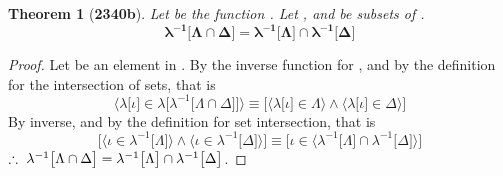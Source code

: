 \documentclass[preview]{standalone}
\newtheorem*{theorem*}{Theorem}
\begin{document}
\begin{theorem*}[\textbf{2340b}]
    Let \bm{$\lambda$} be the function 
    . 
    Let \bm{$\Lambda$}, and \bm{$\Delta$} 
    be subsets of . 
    \begin{equation*}
        \bm{
        \lambda ^{-1} \big[ \Lambda \cap \Delta \big] 
            = 
        \lambda ^{-1} 
            \big[ \Lambda \big] 
                \cap 
            \lambda^{-1} \big[ \Delta \big]
        }
    \end{equation*}
\end{theorem*}

\begin{proof}
    Let \bm{$\iota$} be an element in .
    By the inverse function for
    , 
    and by the definition for the intersection of sets, that is 
    \begin{equation*}
        \bigg \langle \lambda 
            \big[ \iota \big] 
                \in 
            \lambda \Big[ 
                \lambda ^{-1} \big[ \Lambda \cap \Delta \big]
            \Big]
        \bigg \rangle
            \equiv
        \bigg[
            \Big \langle \lambda \big[ \iota \big] \in \Lambda \Big \rangle
                \land 
            \Big \langle \lambda \big[ \iota \big] \in \Delta \Big \rangle
        \bigg]
    \end{equation*}
    By \bm{$\lambda$} inverse, and by the definition for set intersection, that is
    \begin{equation*}
        \bigg[
            \Big \langle
                \iota \in \lambda^{-1} \big[ \Lambda \big] 
            \Big \rangle
                \land 
            \Big \langle
                \iota \in \lambda^{-1} \big[ \Delta \big]
            \Big \rangle
        \bigg]
            \equiv
        \bigg[ 
            \iota \in \Big \langle
                \lambda ^{-1} \big[ \Lambda \big] 
                    \cap 
                \lambda ^{-1} \big[ \Delta \big]
            \Big \rangle
        \bigg]
    \end{equation*}
    $\therefore \text{\space} \relax{
    \lambda ^{-1} \big[ \Lambda \cap \Delta \big] 
        = 
    \lambda ^{-1} 
        \big[ \Lambda \big] 
            \cap 
        \lambda^{-1} \big[ \Delta \big]
    }$.
\color{lightgray} \end{proof}
\end{document}
